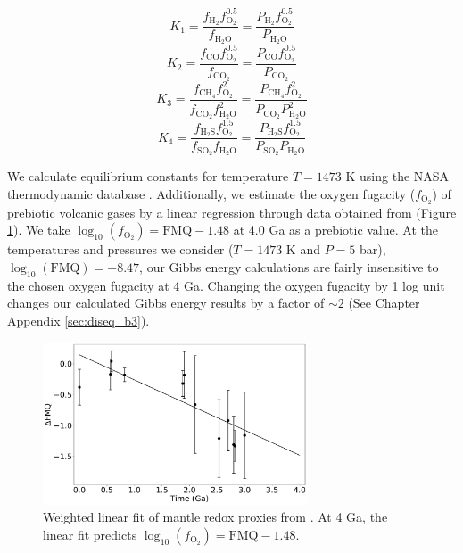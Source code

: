 \begin{equation}
  \label{eq:K_1_equilibrium}
  K_1 = \frac{f_\mathrm{H_2} f_\mathrm{O_2}^{0.5}}{f_\mathrm{H_2O}} = \frac{P_\mathrm{H_2} f_\mathrm{O_2}^{0.5}}{P_\mathrm{H_2O}}
\end{equation}
\begin{equation}
  K_2 = \frac{f_\mathrm{CO} f_\mathrm{O_2}^{0.5}}{f_\mathrm{CO_2}} = \frac{P_\mathrm{CO} f_\mathrm{O_2}^{0.5}}{P_\mathrm{CO_2}}
\end{equation}
\begin{equation}
  K_3 = \frac{f_\mathrm{CH_4} f_\mathrm{O_2}^{2}}{f_\mathrm{CO_2} f_\mathrm{H_2O}^2} = \frac{P_\mathrm{CH_4} f_\mathrm{O_2}^{2}}{P_\mathrm{CO_2} P_\mathrm{H_2O}^2} 
\end{equation}
\begin{equation}
  K_4 = \frac{f_\mathrm{H_2S} f_\mathrm{O_2}^{1.5}}{f_\mathrm{SO_2} f_\mathrm{H_2O}} = \frac{P_\mathrm{H_2S} f_\mathrm{O_2}^{1.5}}{P_\mathrm{SO_2} P_\mathrm{H_2O}} 
\end{equation}

We calculate equilibrium constants for temperature $T = 1473$ K using the NASA thermodynamic database \citep{Burcat_2005}. Additionally, we estimate the oxygen fugacity ($f_\mathrm{O_2}$) of prebiotic volcanic gases by a linear regression through data obtained from \citet{Aulbach_2016} (Figure \ref{fig:diseq_figure5}). We take $\log_{10}\left(f_\mathrm{O_2}\right) = \mathrm{FMQ} - 1.48$ at 4.0 Ga as a prebiotic value. At the temperatures and pressures we consider ($T = 1473$ K and  $P = 5$ bar), $\log_{10}\left(\mathrm{FMQ}\right) = -8.47$, our Gibbs energy calculations are fairly insensitive to the chosen oxygen fugacity at 4 Ga. Changing the oxygen fugacity by 1 log unit changes our calculated Gibbs energy results by a factor of $\sim 2$ (See Chapter Appendix \ref{sec:diseq_b3}).

\begin{figure}
  \centering
  \includegraphics[width=0.7\textwidth]{tex/2diseq/Figure5.pdf}
  \caption{Weighted linear fit of mantle redox proxies from \citet{Aulbach_2016}. At 4 Ga, the linear fit predicts $\log_{10}\left(f_\mathrm{O_2}\right) = \mathrm{FMQ} - 1.48$.}
  \label{fig:diseq_figure5}
\end{figure}

